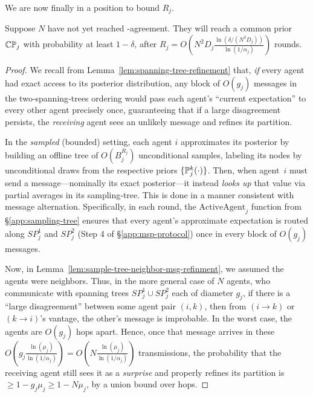 We are now finally in a position to bound $R_j$.
\begin{lemma}
\label{lem:common-prior-sampling-tree}
Suppose $N$ have not yet reached \agree-agreement. 
They will reach a common prior $\mathbb{C}\mathbb{P}_j$ with probability at least $1 - \delta$, after $R_j = O\left(N^2D_j\frac{\ln\left(\delta/(N^2D_j)\right)}{\ln\left(1/\alpha_j\right)}\right)$ rounds.
\end{lemma}
\begin{proof}
We recall from Lemma~\ref{lem:spanning-tree-refinement} that, \emph{if} every
agent had exact access to its posterior distribution, any block of
$O\left(g_j\right)$ messages in the two‐spanning‐trees ordering would pass each agent's ``current expectation'' to every other agent precisely once, guaranteeing that if a large disagreement persists, the \emph{receiving} agent sees an unlikely message and refines its partition.

In the \emph{sampled} (bounded) setting, each agent $i$ approximates its posterior by building an offline tree of $O\left(B_j^{R_j}\right)$ unconditional samples, labeling its nodes by unconditional draws from the respective priors $\{\mathbb{P}^k_j(\cdot)\}$.
Then, when agent~$i$ must send a message---nominally its exact posterior---it instead \emph{looks up} that value via partial averages in its sampling‐tree.
This is done in a manner consistent with message alternation.
Specifically, in each round, the $\mathrm{ActiveAgent}_j$ function from \S\ref{app:sampling-tree} ensures that every agent's approximate expectation is routed along ${SP}^1_j$ and ${SP}^2_j$ (Step 4 of \S\ref{app:msp-protocol}) once in every block of $O\left(g_j\right)$ messages.

Now, in Lemma~\ref{lem:sample-tree-neighbor-msg-refinment}, we assumed the agents were neighbors.
Thus, in the more general case of $N$ agents, who communicate with spanning trees ${SP}^1_j\cup{SP}^2_j$ each of diameter $g_j$, if there is a ``large disagreement'' between some agent pair $(i,k)$, then from $(i\!\to\!k)$ or $(k\!\to\!i)$'s vantage, the other’s message is improbable.
In the worst case, the agents are $O(g_j)$ hops apart.
Hence, once that message arrives in these $O\left(g_j \frac{\ln\left(\mu_j\right)}{\ln\left(1/\alpha_j\right)}\right) = O\left(N \frac{\ln\left(\mu_j\right)}{\ln\left(1/\alpha_j\right)}\right)$ transmissions, the probability that the receiving agent still sees it as a \emph{surprise} and properly refines its partition is $\ge 1 - g_j\mu_j \ge 1 - N\mu_j$, by a union bound over hops.


\end{proof}
